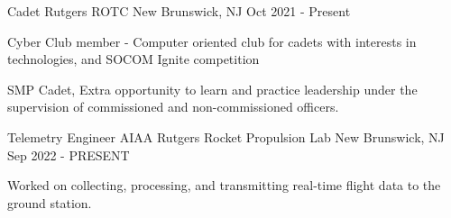 

\begin{cventries}

  \cventry
    {Cadet} %
    {Rutgers ROTC} %
    {New Brunswick,  NJ} %
    {Oct 2021 - Present} %
    {
      \begin{cvitems} %
        \item {Cyber Club member - Computer oriented club for cadets with interests in technologies, and SOCOM Ignite competition}
        \item {SMP Cadet,  Extra opportunity to learn and practice leadership under the supervision of commissioned and non-commissioned officers.}
      \end{cvitems}
    }

  \cventry
    {Telemetry Engineer} %
    {AIAA Rutgers Rocket Propulsion Lab} %
    {New Brunswick,  NJ} %
    {Sep 2022 - PRESENT} %
    {
      \begin{cvitems} %
        \item {Worked on collecting, processing, and transmitting real-time flight data to the ground station.}
      \end{cvitems}
    }

\end{cventries}
